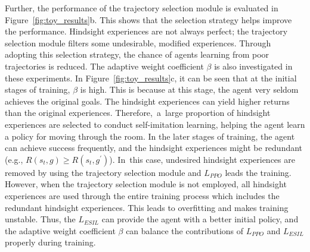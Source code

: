 Further, {the performance of the trajectory selection module is evaluated} in Figure~\ref{fig:toy_results}b. This shows that the selection strategy helps improve the performance. Hindsight experiences are not always perfect; the trajectory selection module filters some undesirable, modified experiences. Through adopting this selection strategy, the chance of agents learning from poor trajectories is reduced. The adaptive weight coefficient $\beta$ is also investigated in these experiments. {In Figure~\ref{fig:toy_results}c, it can be seen that at the initial stages of training, $\beta$ is high}. {This is because at this stage, the agent very seldom achieves the original goals}. The hindsight experiences can yield higher returns than the original experiences. {Therefore,~a~large proportion of hindsight experiences are selected to conduct self-imitation learning, helping the agent learn a policy for moving through the room}. In the later stages of training, the agent can achieve success frequently, and the hindsight experiences might be redundant (e.g., $R(s_{t}, g)\geq R(s_{t}, g^{\prime})$). In~this case, undesired hindsight experiences are removed by using the trajectory selection module and $L_{PPO}$ leads the training. However, when the trajectory selection module is not employed, all hindsight experiences are used through the entire training process which includes the redundant hindsight experiences. This leads to overfitting and makes training unstable. Thus, the $L_{ESIL}$ can provide the agent with a better initial policy, and the adaptive weight coefficient $\beta$ can balance the contributions of $L_{PPO}$ and $L_{ESIL}$ properly during training.

